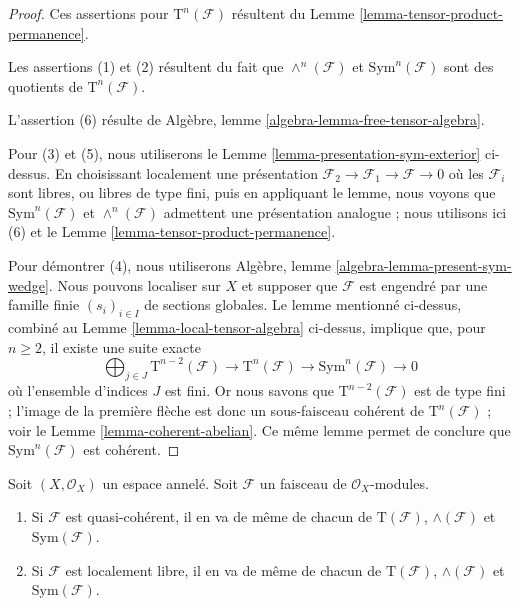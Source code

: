 \begin{proof}
Ces assertions pour $\text{T}^n(\mathcal{F})$ résultent du
Lemme \ref{lemma-tensor-product-permanence}.

\medskip\noindent
Les assertions (1) et (2) résultent du fait que
$\wedge^n(\mathcal{F})$ et $\text{Sym}^n(\mathcal{F})$
sont des quotients de $\text{T}^n(\mathcal{F})$.

\medskip\noindent
L'assertion (6) résulte de
Algèbre, lemme \ref{algebra-lemma-free-tensor-algebra}.

\medskip\noindent
Pour (3) et (5), nous utiliserons le
Lemme \ref{lemma-presentation-sym-exterior} ci-dessus.
En choisissant localement une présentation
$\mathcal{F}_2 \to \mathcal{F}_1 \to \mathcal{F} \to 0$
où les $\mathcal{F}_i$ sont libres, ou libres de type fini, puis en appliquant le
lemme, nous voyons que $\text{Sym}^n(\mathcal{F})$ et $\wedge^n(\mathcal{F})$
admettent une présentation analogue ; nous utilisons ici (6) et le
Lemme \ref{lemma-tensor-product-permanence}.

\medskip\noindent
Pour démontrer (4), nous utiliserons
Algèbre, lemme \ref{algebra-lemma-present-sym-wedge}.
Nous pouvons localiser sur $X$ et supposer que
$\mathcal{F}$ est engendré par une famille finie
$(s_i)_{i \in I}$ de sections globales.
Le lemme mentionné ci-dessus,
combiné au Lemme \ref{lemma-local-tensor-algebra} ci-dessus,
implique que, pour $n \geq 2$,
il existe une suite exacte
$$
\bigoplus\nolimits_{j \in J}
\text{T}^{n - 2}(\mathcal{F})
\to
\text{T}^n(\mathcal{F})
\to
\text{Sym}^n(\mathcal{F})
\to
0
$$
où l'ensemble d'indices $J$ est fini. Or nous savons que
$\text{T}^{n - 2}(\mathcal{F})$ est de type fini ;
l'image de la première flèche est donc un sous-faisceau cohérent
de $\text{T}^n(\mathcal{F})$ ; voir le Lemme \ref{lemma-coherent-abelian}.
Ce même lemme permet de conclure que $\text{Sym}^n(\mathcal{F})$ est
cohérent.
\end{proof}

\begin{lemma}
\label{lemma-whole-tensor-algebra-permanence}
Soit $(X, \mathcal{O}_X)$ un espace annelé.
Soit $\mathcal{F}$ un faisceau de $\mathcal{O}_X$-modules.
\begin{enumerate}
\item Si $\mathcal{F}$ est quasi-cohérent,
il en va de même de chacun de $\text{T}(\mathcal{F})$,
$\wedge(\mathcal{F})$ et $\text{Sym}(\mathcal{F})$.
\item Si $\mathcal{F}$ est localement libre,
il en va de même de chacun de $\text{T}(\mathcal{F})$,
$\wedge(\mathcal{F})$ et $\text{Sym}(\mathcal{F})$.
\end{enumerate}
\end{lemma}

